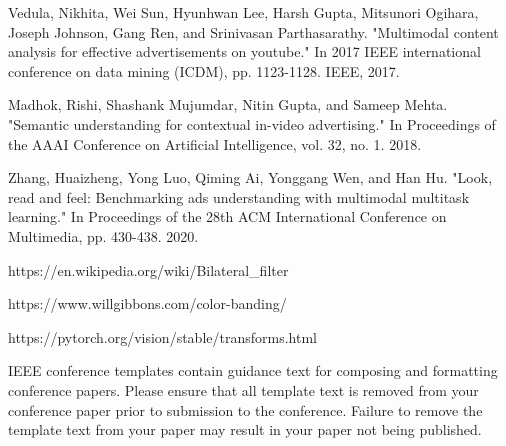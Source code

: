 \documentclass[conference]{IEEEtran}
\begin{document}
\begin{thebibliography}{00}
 Vedula, Nikhita, Wei Sun, Hyunhwan Lee, Harsh Gupta, Mitsunori Ogihara, Joseph Johnson, Gang Ren, and Srinivasan Parthasarathy. "Multimodal content analysis for effective advertisements on youtube." In 2017 IEEE international conference on data mining (ICDM), pp. 1123-1128. IEEE, 2017.

 Madhok, Rishi, Shashank Mujumdar, Nitin Gupta, and Sameep Mehta. "Semantic understanding for contextual in-video advertising." In Proceedings of the AAAI Conference on Artificial Intelligence, vol. 32, no. 1. 2018.

 Zhang, Huaizheng, Yong Luo, Qiming Ai, Yonggang Wen, and Han Hu. "Look, read and feel: Benchmarking ads understanding with multimodal multitask learning." In Proceedings of the 28th ACM International Conference on Multimedia, pp. 430-438. 2020.

 https://en.wikipedia.org/wiki/Bilateral\_filter

 https://www.willgibbons.com/color-banding/

 https://pytorch.org/vision/stable/transforms.html

\end{thebibliography}
\vspace{12pt}
\color{red}
IEEE conference templates contain guidance text for composing and formatting conference papers. Please ensure that all template text is removed from your conference paper prior to submission to the conference. Failure to remove the template text from your paper may result in your paper not being published.
\end{document}
